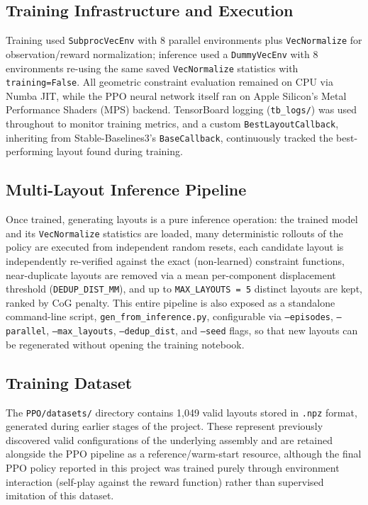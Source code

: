\documentclass[11pt,a4paper,oneside]{report}
\begin{document}
\subsection{Training Infrastructure and Execution}
Training used \texttt{SubprocVecEnv} with 8 parallel environments plus \texttt{VecNormalize} for observation/reward normalization; inference used a \texttt{DummyVecEnv} with 8 environments re-using the same saved \texttt{VecNormalize} statistics with \texttt{training=False}. All geometric constraint evaluation remained on CPU via Numba JIT, while the PPO neural network itself ran on Apple Silicon's Metal Performance Shaders (MPS) backend. TensorBoard logging (\texttt{tb\_logs/}) was used throughout to monitor training metrics, and a custom \texttt{BestLayoutCallback}, inheriting from Stable-Baselines3's \texttt{BaseCallback}, continuously tracked the best-performing layout found during training.

\subsection{Multi-Layout Inference Pipeline}
Once trained, generating layouts is a pure inference operation: the trained model and its \texttt{VecNormalize} statistics are loaded, many deterministic rollouts of the policy are executed from independent random resets, each candidate layout is independently re-verified against the exact (non-learned) constraint functions, near-duplicate layouts are removed via a mean per-component displacement threshold (\texttt{DEDUP\_DIST\_MM}), and up to \texttt{MAX\_LAYOUTS = 5} distinct layouts are kept, ranked by CoG penalty. This entire pipeline is also exposed as a standalone command-line script, \texttt{gen\_from\_inference.py}, configurable via \texttt{--episodes}, \texttt{--parallel}, \texttt{--max\_layouts}, \texttt{--dedup\_dist}, and \texttt{--seed} flags, so that new layouts can be regenerated without opening the training notebook.

\subsection{Training Dataset}
The \texttt{PPO/datasets/} directory contains 1{,}049 valid layouts stored in \texttt{.npz} format, generated during earlier stages of the project. These represent previously discovered valid configurations of the underlying assembly and are retained alongside the PPO pipeline as a reference/warm-start resource, although the final PPO policy reported in this project was trained purely through environment interaction (self-play against the reward function) rather than supervised imitation of this dataset.
\end{document}

